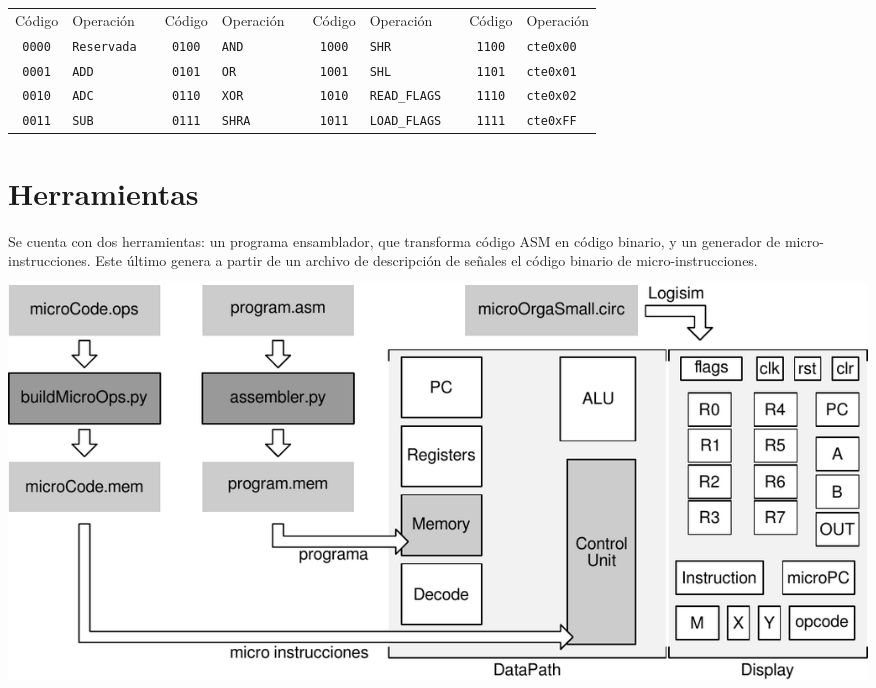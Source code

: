 \documentclass[a4paper,11pt]{article}
\begin{document}
\small
\begin{center}
\begin{tabular}[t]{c|lcc|lcc|lcc|l}
Código        & Operación    & & Código        & Operación    & & Código        & Operación    & & Código        & Operación        \\
\cline{1-2}                      \cline{4-5}                       \cline{7-8}                     \cline{10-11}
\texttt{0000} & \texttt{Reservada}   & & \texttt{0100} & \texttt{AND}  & & \texttt{1000} & \texttt{SHR}           & & \texttt{1100} & \texttt{cte0x00} \\
\texttt{0001} & \texttt{ADD}         & & \texttt{0101} & \texttt{OR}   & & \texttt{1001} & \texttt{SHL}           & & \texttt{1101} & \texttt{cte0x01} \\
\texttt{0010} & \texttt{ADC}         & & \texttt{0110} & \texttt{XOR}  & & \texttt{1010} & \texttt{READ\_FLAGS}   & & \texttt{1110} & \texttt{cte0x02} \\
\texttt{0011} & \texttt{SUB}         & & \texttt{0111} & \texttt{SHRA} & & \texttt{1011} & \texttt{LOAD\_FLAGS}   & & \texttt{1111} & \texttt{cte0xFF} \\
\end{tabular}
\end{center}
\normalsize

\section*{Herramientas}

Se cuenta con dos herramientas: un programa ensamblador, que transforma código ASM en código binario, y un generador de micro-instrucciones.
Este último genera a partir de un archivo de descripción de señales el código binario de micro-instrucciones.

\begin{center}
\includegraphics[scale=0.6]{img/herramientas.pdf}
\end{center}
\end{document}

